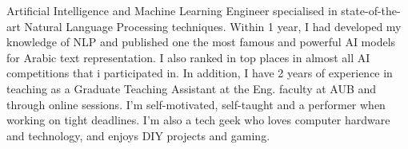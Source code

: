 
\begin{cvparagraph}
Artificial Intelligence and Machine Learning Engineer specialised in state-of-the-art Natural Language Processing techniques. Within 1 year, I had developed my knowledge of NLP and published one the most famous and powerful AI models for Arabic text representation. I also ranked in top places in almost all AI competitions that i participated in. In addition, I have 2 years of experience in teaching as a Graduate Teaching Assistant at the Eng. faculty at AUB and through online sessions. I'm self-motivated, self-taught and a performer when working on tight deadlines.
I'm also a tech geek who loves computer hardware and technology, and enjoys DIY projects and gaming.
\end{cvparagraph}

